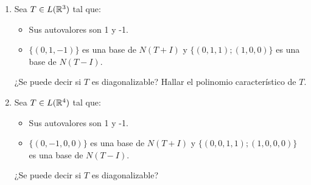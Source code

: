 \item \begin{enumerate}
        \item Sea $T\in L(\mathbb{R}^3)$ tal que:
            \begin{itemize}
                \item Sus autovalores son 1 y -1.
                \item $\{(0,1,-1)\}$ es una base de $N(T+I)$ y $\{(0,1,1);(1,0,0)\}$ es una base de $N(T-I)$.
            \end{itemize}
            ¿Se puede decir si $T$ es diagonalizable? Hallar el polinomio característico de $T$.
            \begin{mdframed}[style=s]
                
            \end{mdframed}
        \item Sea $T\in L(\mathbb{R}^4)$ tal que:
            \begin{itemize}
                \item Sus autovalores son 1 y -1.
                \item $\{(0,-1,0,0)\}$ es una base de $N(T+I)$ y $\{(0,0,1,1);(1,0,0,0)\}$ es una base de $N(T-I)$.
            \end{itemize}
            ¿Se puede decir si $T$ es diagonalizable?
            \begin{mdframed}[style=s]
                
            \end{mdframed}
    \end{enumerate}